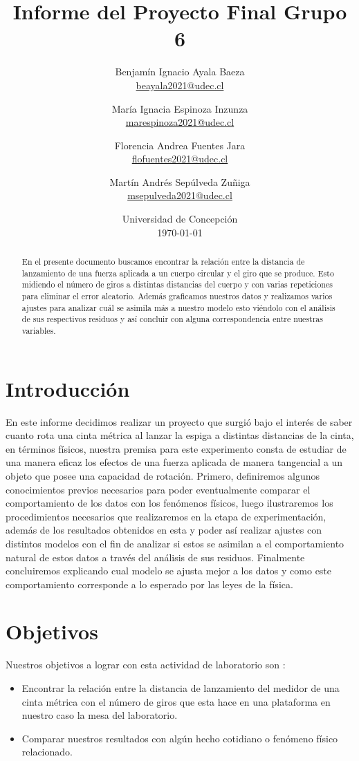 \documentclass[11pt]{article}
\title{Informe del Proyecto Final Grupo 6}
\author{Benjam\'in Ignacio Ayala Baeza  \\ \href{mailto:beayala2021@udec.cl}{beayala2021@udec.cl} 
        \and Mar\'ia Ignacia Espinoza Inzunza \\ \href{mailto:marespinoza2021@udec.cl}{marespinoza2021@udec.cl} \\
        \and Florencia Andrea Fuentes Jara \\ \href{mailto:flofuentes2021@udec.cl}{flofuentes2021@udec.cl} \\
        \and Mart\'in Andrés Sepúlveda Zu\~niga \\ \href{mailto:msepulveda2021@udec.cl}{msepulveda2021@udec.cl} \\
\date{Universidad de Concepci\'on \\ \today}
}
\begin{document}
\maketitle

\begin{abstract}
En el presente documento buscamos encontrar la relación entre la distancia de lanzamiento de una fuerza aplicada a un cuerpo circular y el giro que se produce. Esto midiendo el número de giros a distintas distancias del cuerpo y con varias repeticiones para eliminar el error aleatorio. Además graficamos nuestros datos y realizamos varios ajustes para analizar cuál se asimila más a nuestro modelo esto viéndolo con el análisis de sus respectivos residuos y así concluir con alguna correspondencia entre nuestras variables.
\end{abstract}

\section{Introducción} \label{intro}
 En este informe decidimos realizar un proyecto que surgió bajo el interés de saber cuanto rota una cinta métrica al lanzar la espiga a distintas distancias de la cinta, en términos físicos, nuestra premisa para este experimento consta de estudiar de una manera eficaz los efectos de una fuerza aplicada de manera tangencial a un objeto que posee una capacidad de rotación.
 \medskip
 Primero, definiremos algunos conocimientos previos necesarios para poder eventualmente comparar el comportamiento de los datos con los fenómenos físicos, luego ilustraremos los procedimientos necesarios que realizaremos en la etapa de experimentación, además de los resultados obtenidos en esta y poder así realizar ajustes con distintos modelos con el fin de analizar si estos se asimilan a el comportamiento natural de estos datos a través del análisis de sus residuos. Finalmente concluiremos explicando cual modelo se ajusta mejor a los datos y como este comportamiento corresponde a lo esperado por las leyes de la física. 

\section{Objetivos}
Nuestros objetivos a lograr con esta actividad de laboratorio son :

\begin{itemize}
    \item Encontrar la relación entre la distancia de lanzamiento del medidor de una cinta métrica con el número de giros que esta hace en una plataforma en nuestro caso la mesa del laboratorio.
    \item Comparar nuestros resultados con algún hecho cotidiano o fenómeno físico relacionado.
\end{itemize}
\end{document}
